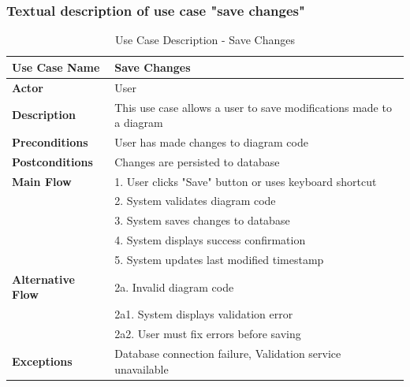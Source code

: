 \subsubsection{Textual description of use case "save changes"}
\begin{table}[H]
\centering
\caption{Use Case Description - Save Changes}
\begin{tabular}{|l|p{10cm}|}
\hline
\textbf{Use Case Name} & Save Changes \\
\hline
\textbf{Actor} & User \\
\hline
\textbf{Description} & This use case allows a user to save modifications made to a diagram \\
\hline
\textbf{Preconditions} & User has made changes to diagram code \\
\hline
\textbf{Postconditions} & Changes are persisted to database \\
\hline
\textbf{Main Flow} & 1. User clicks "Save" button or uses keyboard shortcut \\
& 2. System validates diagram code \\
& 3. System saves changes to database \\
& 4. System displays success confirmation \\
& 5. System updates last modified timestamp \\
\hline
\textbf{Alternative Flow} & 2a. Invalid diagram code \\
& 2a1. System displays validation error \\
& 2a2. User must fix errors before saving \\
\hline
\textbf{Exceptions} & Database connection failure, Validation service unavailable \\
\hline
\end{tabular}
\end{table}

